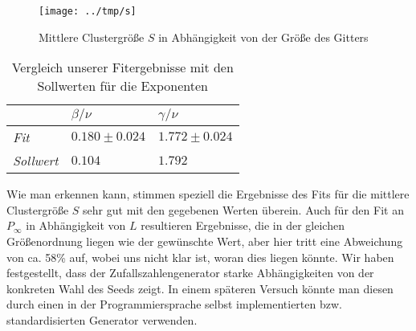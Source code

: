 \begin{figure}[htb]
  \centering
  \texttt{[image: ../tmp/s]}
  \caption{Mittlere Clustergröße $S$ in Abhängigkeit von der Größe des Gitters}
  \label{fig:S}
\end{figure}

\begin{table}[htbp]
\centering
\setlength{\tabcolsep}{14pt}
\begin{tabular*}{0.5\columnwidth}{lll}
\toprule
& {$β/ν$} & {$γ/ν$}\\
\midrule
\textit{Fit} & $0.180\pm0.024$ & $1.772\pm0.024$ \\
\textit{Sollwert} & $0.104$ & $1.792$ \\
\bottomrule
\end{tabular*}
\label{tab:res}
\caption{Vergleich unserer Fitergebnisse mit den Sollwerten für die Exponenten}
\end{table}

Wie man erkennen kann, stimmen speziell die Ergebnisse des Fits für die mittlere Clustergröße $S$
sehr gut mit den gegebenen Werten überein. Auch für den Fit an $P_{\infty}$ in Abhängigkeit von
$L$ resultieren Ergebnisse, die in der gleichen Größenordnung liegen wie der gewünschte Wert, aber hier
tritt eine Abweichung von ca. 58\% auf, wobei uns nicht klar ist, woran dies liegen könnte. Wir haben
festgestellt, dass der Zufallszahlengenerator starke Abhängigkeiten von der konkreten Wahl des Seeds
zeigt. In einem späteren Versuch könnte man diesen durch einen in der Programmiersprache selbst implementierten
bzw. standardisierten Generator verwenden.
